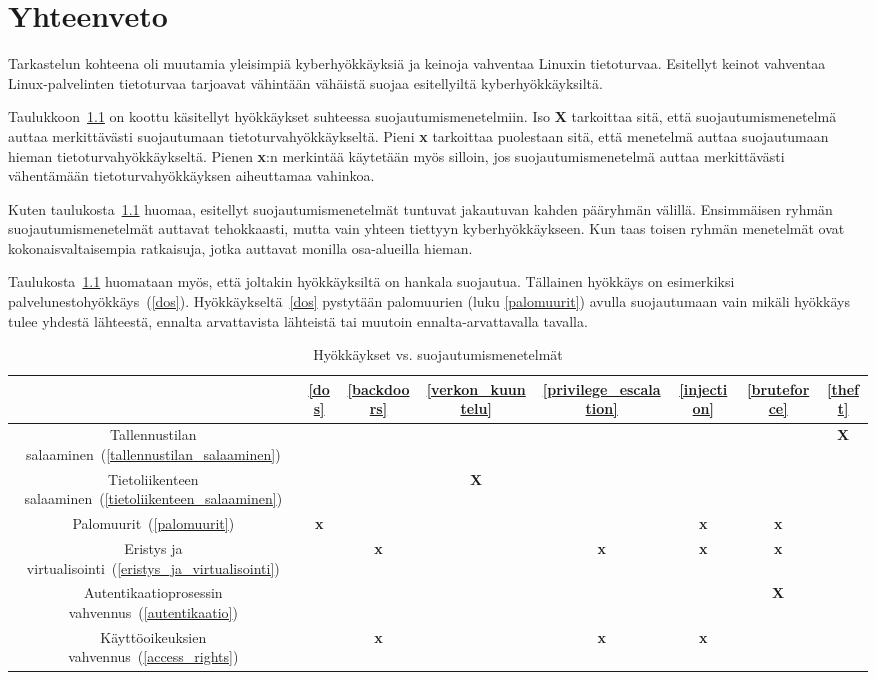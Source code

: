 \chapter{Yhteenveto}\label{yhteenveto}

Tarkastelun kohteena oli muutamia yleisimpiä kyberhyökkäyksiä ja keinoja vahventaa Linuxin tietoturvaa. Esitellyt keinot vahventaa Linux-palvelinten tietoturvaa tarjoavat vähintään vähäistä suojaa esitellyiltä kyberhyökkäyksiltä.

Taulukkoon~\ref{tab:security-table} on koottu käsitellyt hyökkäykset suhteessa suojautumismenetelmiin. Iso \textbf{X} tarkoittaa sitä, että suojautumismenetelmä auttaa merkittävästi suojautumaan tietoturvahyökkäykseltä. Pieni \textbf{x} tarkoittaa puolestaan sitä, että menetelmä auttaa suojautumaan hieman tietoturvahyökkäykseltä. Pienen \textbf{x}:n merkintää käytetään myös silloin, jos suojautumismenetelmä auttaa merkittävästi vähentämään tietoturvahyökkäyksen aiheuttamaa vahinkoa.

Kuten taulukosta~\ref{tab:security-table} huomaa, esitellyt suojautumismenetelmät tuntuvat jakautuvan kahden pääryhmän välillä. Ensimmäisen ryhmän suojautumismenetelmät auttavat tehokkaasti, mutta vain yhteen tiettyyn kyberhyökkäykseen. Kun taas toisen ryhmän menetelmät ovat kokonaisvaltaisempia ratkaisuja, jotka auttavat monilla osa-alueilla hieman.

Taulukosta~\ref{tab:security-table} huomataan myös, että joltakin hyökkäyksiltä on hankala suojautua. Tällainen hyökkäys on esimerkiksi palvelunestohyökkäys~(\ref{dos}). Hyökkäykseltä~\ref{dos} pystytään palomuurien (luku \ref{palomuurit}) avulla suojautumaan vain mikäli hyökkäys tulee yhdestä lähteestä, ennalta arvattavista lähteistä tai muutoin ennalta-arvattavalla tavalla.

\begin{table}
\centering{}\caption{Hyökkäykset vs. suojautumismenetelmät\label{tab:security-table}}
\begin{tabular}{c|c|c|c|c|c|c|c|}
   &\ref{dos}&\ref{backdoors}&\ref{verkon_kuuntelu}&\ref{privilege_escalation}&\ref{injection}&\ref{bruteforce}&\ref{theft} \tabularnewline\hline
    Tallennustilan salaaminen~(\ref{tallennustilan_salaaminen}) & & & & & & & \textbf{X}\tabularnewline\hline
    Tietoliikenteen salaaminen~(\ref{tietoliikenteen_salaaminen}) & & & \textbf{X} & & & &\tabularnewline\hline
    Palomuurit~(\ref{palomuurit}) & \textbf{x} & & & & \textbf{x} & \textbf{x} &\tabularnewline\hline
    Eristys ja virtualisointi~(\ref{eristys_ja_virtualisointi}) & & \textbf{x} & & \textbf{x} & \textbf{x} & \textbf{x} &\tabularnewline\hline
    Autentikaatioprosessin vahvennus~(\ref{autentikaatio}) & & & & & & \textbf{X} &\tabularnewline\hline
    Käyttöoikeuksien vahvennus~(\ref{access_rights}) & & \textbf{x} & & \textbf{x} & \textbf{x} & &\tabularnewline\hline
\end{tabular}
\end{table}
